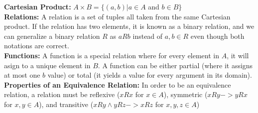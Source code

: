 


\textbf{Cartesian Product: }$ A \times B = \{(a, b) | a \in A $ and $ b \in B\} $ \\

\noindent\textbf{Relations: }A relation is a set of tuples all taken from the same Cartesian product. If the relation has two elements, it is known as a binary relation, and we can generalize a binary relation $R$ as $aRb$ instead of $a,b \in R$ even though both notations are correct. \\

\noindent\textbf{Functions: }A function is a special relation where for every element in $A$, it will asign to a unique element in $B$. A function can be either partial (where it assigns at most one $b$ value) or total (it yields a value for every argument in its domain). \\

\noindent\textbf{Properties of an Equivalence Relation: }In order to be an equivalence relation, a relation must be reflexive ($xRx $ for $ x \in A$), symmetric ($xRy -> yRx $ for $ x,y \in A$), and transitive ($xRy \wedge yRz -> xRz $ for $ x,y,z \in A$)


